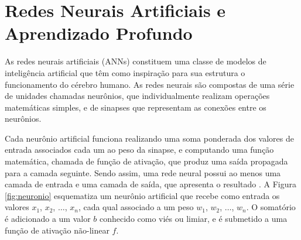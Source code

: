 \documentclass[
	12pt,				%
	openright,			%
	twoside,			%
	a4paper,			%
	tcc,			%
	]{ABNT-DC-UEL}
\begin{document}
\section{Redes Neurais Artificiais e Aprendizado Profundo}

As redes neurais artificiais (ANNs) constituem uma classe de modelos de inteligência artificial que têm como inspiração para sua estrutura o funcionamento do cérebro humano. As redes neurais são compostas de uma série de unidades chamadas neurônios, que individualmente realizam operações matemáticas simples, e de sinapses que representam as conexões entre os neurônios. 

Cada neurônio artificial funciona realizando uma soma ponderada dos valores de entrada associados cada um ao peso da sinapse, e computando uma função matemática, chamada de função de ativação, que produz uma saída propagada para a camada seguinte. Sendo assim, uma rede neural possui ao menos uma camada de entrada e uma camada de saída, que apresenta o resultado \cite{krogh:08, mathew:21}. A Figura \ref{fig:neuronio} esquematiza um neurônio artificial que recebe como entrada os valores $x_1$, $x_2$, $\dots$, $x_n$, cada qual associado a um peso $w_1$, $w_2$, $\dots$, $w_n$. O somatório é adicionado a um valor $b$ conhecido como viés ou limiar, e é submetido a uma função de ativação não-linear $f$.
\end{document}
